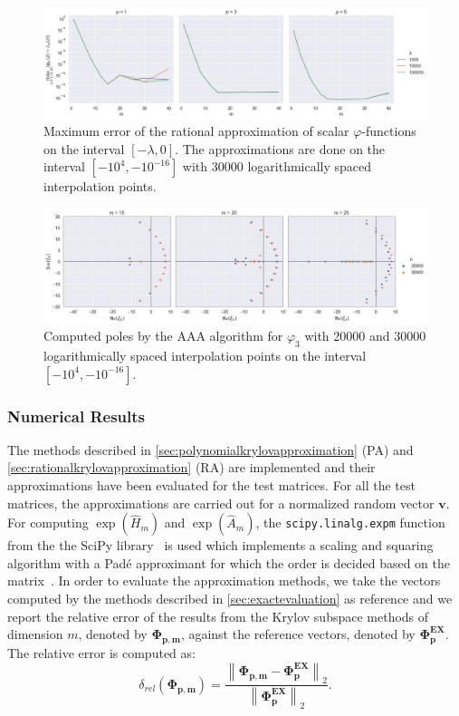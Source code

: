 \begin{figure}[h!]
    \centering
    \includegraphics[width=.9\textwidth]{img/AAA/errors_ms_log30k.png}
    \caption{
        Maximum error of the rational approximation of scalar $\varphi$-functions
        on the interval $[-\lambda, 0]$.
        The approximations are done on the interval $[-10^4, -10^{-16}]$ with $30000$
        logarithmically spaced interpolation points.
    }
    \label{fig:errorsAAAms}
\end{figure}

\begin{figure}[h!]
    \centering
    \includegraphics[width=.9\textwidth]{img/AAA/poles_ms_log_p03.png}
    \caption{
        Computed poles by the AAA algorithm for $\varphi_3$ with 20000 and 30000
        logarithmically spaced interpolation points on the interval $[-10^{4}, -10^{-16}]$.
    }
    \label{fig:polesAAAms}
\end{figure}

\FloatBarrier

\subsubsection*{Numerical Results}
The methods described in \autoref{sec:polynomialkrylovapproximation} (PA)
and \autoref{sec:rationalkrylovapproximation} (RA)
are implemented and their approximations have been evaluated for the test matrices.
For all the test matrices, the approximations are carried out for a normalized
random vector $\mathbf{v}$.
For computing $\exp(\hat{H}_m)$ and $\exp(\hat{A}_m)$, the \texttt{scipy.linalg.expm}
function from the the SciPy library~\cite{SciPy2020} is used which implements a
scaling and squaring algorithm with a Padé approximant for which the order is decided
based on the matrix~\cite{almohy2010scaling}.
In order to evaluate the approximation methods, we take the vectors computed by the methods
described in \autoref{sec:exactevaluation} as reference and we report the relative
error of the results from the Krylov subspace methods of dimension $m$, denoted by
$\mathbf{\Phi_{p, m}}$, against the reference vectors, denoted by $\mathbf{\Phi_p^{EX}}$.
The relative error is computed as:
\begin{equation*}
    \delta_{rel}(\mathbf{\Phi_{p, m}}) =
    \frac{\left\| \mathbf{\Phi_{p, m}} - \mathbf{\Phi_p^{EX}} \right\|_2}
    {\left\| \mathbf{\Phi_p^{EX}} \right\|_2}.
\end{equation*}

